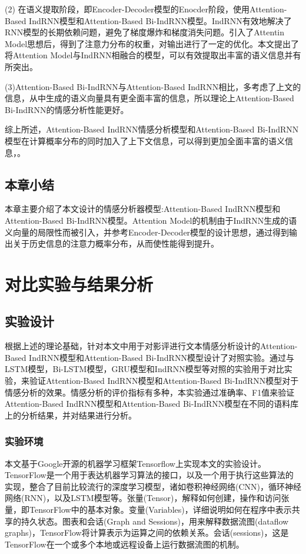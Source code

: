 \documentclass[a4paper,AutoFakeBold,oneside,12pt]{book}
\begin{document}
(2) 在语义提取阶段，即Encoder-Decoder模型的Enocder阶段，使用Attention-Based IndRNN模型和Attention-Based Bi-IndRNN模型。IndRNN有效地解决了RNN模型的长期依赖问题，避免了梯度爆炸和梯度消失问题。引入了Attentin Model思想后，得到了注意力分布的权重，对输出进行了一定的优化。本文提出了将Attention Model与IndRNN相融合的模型，可以有效提取出丰富的语义信息并有所突出。

(3)Attention-Based Bi-IndRNN与Attention-Based IndRNN相比，多考虑了上文的信息，从中生成的语义向量具有更全面丰富的信息，所以理论上Attention-Based Bi-IndRNN的情感分析性能更好。

综上所述，Attention-Based IndRNN情感分析模型和Attention-Based Bi-IndRNN模型在计算概率分布的同时加入了上下文信息，可以得到更加全面丰富的语义信息，。

\section{本章小结}
本章主要介绍了本文设计的情感分析器模型:Attention-Based IndRNN模型和Attention-Based Bi-IndRNN模型。Attention Model的机制由于IndRNN生成的语义向量的局限性而被引入，并参考Encoder-Decoder模型的设计思想，通过得到输出关于历史信息的注意力概率分布，从而使性能得到提升。


\chapter{对比实验与结果分析}


\section{实验设计}
根据上述的理论基础，针对本文中用于对影评进行文本情感分析设计的Attention-Based IndRNN模型和Attention-Based Bi-IndRNN模型设计了对照实验。通过与LSTM模型，Bi-LSTM模型，GRU模型和IndRNN模型等对照的实验用于对比实验，来验证Attention-Based IndRNN模型和Attention-Based Bi-IndRNN模型对于情感分析的效果。情感分析的评价指标有多种，本实验通过准确率、F1值来验证Attention-Based IndRNN模型和Attention-Based Bi-IndRNN模型在不同的语料库上的分析结果，并对结果进行分析。

\subsection{实验环境}
本文基于Google开源的机器学习框架Tensorflow上实现本文的实验设计。TensorFlow是一个用于表达机器学习算法的接口，以及一个用于执行这些算法的实现，整合了目前比较流行的深度学习模型，诸如卷积神经网络(CNN)，循环神经网络(RNN)，以及LSTM模型等。张量(Tensor)，解释如何创建，操作和访问张量，即TensorFlow中的基本对象。变量(Variables)，详细说明如何在程序中表示共享的持久状态。图表和会话(Graph and Sessions)，用来解释数据流图(dataflow graphs)，TensorFlow将计算表示为运算之间的依赖关系。会话(sessions)，这是TensorFlow在一个或多个本地或远程设备上运行数据流图的机制。
\end{document}
